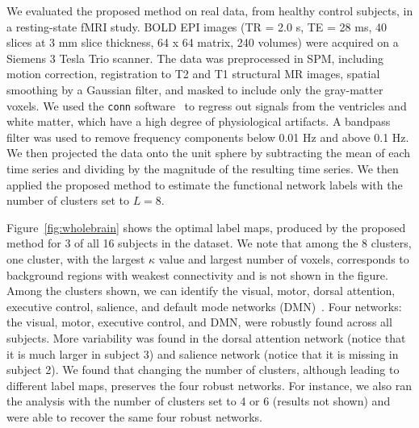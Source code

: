 \documentclass[runningheads, a4paper]{llncs}
\begin{document}
 We evaluated the proposed method on real
data, from healthy control subjects, in a resting-state fMRI study. BOLD EPI
images (TR = 2.0 s, TE = 28 ms, 40 slices at 3 mm slice thickness, 64 x 64
matrix, 240 volumes) were acquired on a Siemens 3 Tesla Trio scanner. The
data was preprocessed in SPM, including motion correction,
registration to T2 and T1 structural MR images, spatial smoothing by a Gaussian
filter, and masked to include only the
gray-matter voxels. We used the \texttt{conn} software~\cite{connwebsite} to
regress out signals from the ventricles and white matter, which have a high
degree of physiological artifacts. A bandpass filter was used to remove
frequency components below 0.01 Hz and above 0.1 Hz. We then projected the data
onto the unit sphere by subtracting the mean of each time series and dividing by
the magnitude of the resulting time series. We then applied the proposed method
to estimate the functional network labels with the number of clusters set to $L = 8$.


Figure~\ref{fig:wholebrain} shows the optimal label maps, produced by the
proposed method for 3  of all 16 subjects in the dataset. We note that among the 8 clusters, one
cluster, with the largest $\kappa$ value and largest number of voxels,
corresponds to background regions with weakest connectivity and is not shown in
the figure. Among the clusters shown, we can identify the visual, motor, dorsal
attention, executive control, salience, and default mode
networks (DMN)~\cite{raichle2001}. Four networks: the visual, motor, executive
control, and DMN, were robustly found across all subjects. More
variability was found in the dorsal attention network (notice that it is much
larger in subject 3) and salience network (notice that it is missing in subject
2). We found that changing the number of clusters, although leading to different
label maps, preserves the four robust networks. For instance, we also ran the
analysis with the number of clusters set to 4 or 6 (results not shown) and were
able to recover the same four robust networks.
\end{document}
